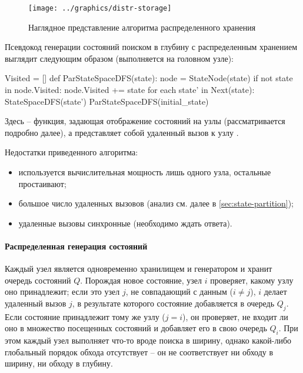 \begin{figure}[!htb]
  \centering
  \texttt{[image: ../graphics/distr-storage]}
  \caption{Наглядное представление алгоритма распределенного хранения}
  \label{fig:distr-storage}
\end{figure}

Псевдокод генерации состояний поиском в глубину с распределенным хранением выглядит
следующим образом (выполняется на головном узле):

\begin{CodeBlock}
Visited = []
def ParStateSpaceDFS(state):
    node = StateNode(state)
    if not state in node.Visited:
        node.Visited += state
        for each state' in Next(state):
            StateSpaceDFS(state')
ParStateSpaceDFS(initial_state)
\end{CodeBlock}

Здесь  -- функция, задающая отображение состояний на узлы (рассматривается
подробно далее), а  представляет собой удаленный вызов к узлу
.

Недостатки приведенного алгоритма:
\begin{itemize}
\item используется вычислительная мощность лишь одного узла, остальные простаивают;
\item большое число удаленных вызовов (анализ см. далее в \ref{sec:state-partition});
\item удаленные вызовы синхронные (необходимо ждать ответа).
\end{itemize}

\paragraph{Распределенная генерация состояний}
\label{sec:distr-generation}

Каждый узел является одновременно хранилищем и генератором и хранит очередь состояний
$Q$. Порождая новое состояние, узел $i$ проверяет, какому узлу оно принадлежит; если это
узел $j$, не совпадающий с данным ($i \neq j$), $i$ делает удаленный вызов $j$, в
результате которого состояние добавляется в очередь $Q_j$. Если состояние принадлежит тому
же узлу ($j = i$), он проверяет, не входит ли оно в множество посещенных состояний
 и добавляет его в свою очередь $Q_i$. При этом каждый узел выполняет что-то
вроде поиска в ширину, однако какой-либо глобальный порядок обхода отсутствует -- он не
соответствует ни обходу в ширину, ни обходу в глубину.


